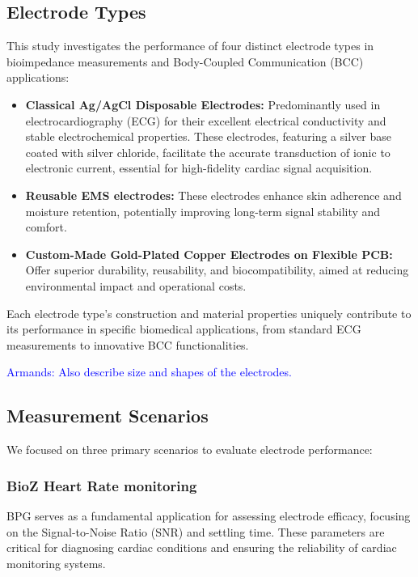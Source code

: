 \documentclass[conference]{IEEEtran}
\newcommand{\notea}[1]{\textcolor{blue}{Armands: #1}}
\begin{document}
\subsection{Electrode Types}
This study investigates the performance of four distinct electrode types in bioimpedance measurements and Body-Coupled Communication (BCC) applications:
\begin{itemize}
    \item \textbf{Classical Ag/AgCl Disposable Electrodes:} Predominantly used in electrocardiography (ECG) for their excellent electrical conductivity and stable electrochemical properties. These electrodes, featuring a silver base coated with silver chloride, facilitate the accurate transduction of ionic to electronic current, essential for high-fidelity cardiac signal acquisition.
    
    \item \textbf{Reusable EMS electrodes:} These electrodes enhance skin adherence and moisture retention, potentially improving long-term signal stability and comfort.
    
    \item \textbf{Custom-Made Gold-Plated Copper Electrodes on Flexible PCB:} Offer superior durability, reusability, and biocompatibility, aimed at reducing environmental impact and operational costs.
    
\end{itemize}

Each electrode type's construction and material properties uniquely contribute to its performance in specific biomedical applications, from standard ECG measurements to innovative BCC functionalities. 

\notea{Also describe size and shapes of the electrodes.}

\subsection{Measurement Scenarios}
We focused on three primary scenarios to evaluate electrode performance:

\subsubsection{BioZ Heart Rate monitoring}
BPG serves as a fundamental application for assessing electrode efficacy, focusing on the Signal-to-Noise Ratio (SNR) and settling time. These parameters are critical for diagnosing cardiac conditions and ensuring the reliability of cardiac monitoring systems.
\end{document}
